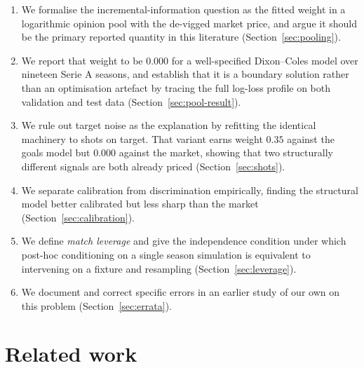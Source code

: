 \documentclass[11pt]{article}
\begin{document}
\begin{enumerate}
\item We formalise the incremental-information question as the fitted weight in
a logarithmic opinion pool with the de-vigged market price, and argue it should
be the primary reported quantity in this literature
(Section~\ref{sec:pooling}).

\item We report that weight to be $0.000$ for a well-specified Dixon--Coles
model over nineteen Serie A seasons, and establish that it is a boundary
solution rather than an optimisation artefact by tracing the full log-loss
profile on both validation and test data (Section~\ref{sec:pool-result}).

\item We rule out target noise as the explanation by refitting the identical
machinery to shots on target. That variant earns weight $0.35$ against the
goals model but $0.000$ against the market, showing that two structurally
different signals are both already priced (Section~\ref{sec:shots}).

\item We separate calibration from discrimination empirically, finding the
structural model better calibrated but less sharp than the market
(Section~\ref{sec:calibration}).

\item We define \emph{match leverage} and give the independence condition under
which post-hoc conditioning on a single season simulation is equivalent to
intervening on a fixture and resampling (Section~\ref{sec:leverage}).

\item We document and correct specific errors in an earlier study of our own on
this problem (Section~\ref{sec:errata}).
\end{enumerate}

\section{Related work}
\label{sec:related}
\end{document}
